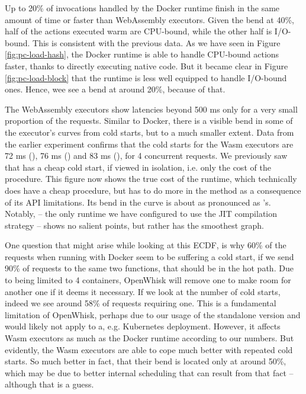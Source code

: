 Up to 20\% of invocations handled by the Docker runtime finish in the same amount of time or faster than WebAssembly executors. Given the bend at 40\%, half of the actions executed warm are CPU-bound, while the other half is I/O-bound. This is consistent with the previous data. As we have seen in Figure \ref{fig:pc-load-hash}, the Docker runtime is able to handle CPU-bound actions faster, thanks to directly executing native code. But it became clear in Figure \ref{fig:pc-load-block} that the runtime is less well equipped to handle I/O-bound ones. Hence, wee see a bend at around 20\%, because of that.

The WebAssembly executors show latencies beyond 500 ms only for a very small proportion of the requests. Similar to Docker, there is a visible bend in some of the executor's curves from cold starts, but to a much smaller extent. Data from the earlier experiment confirms that the cold starts for the Wasm executors are 72 ms (), 76 ms () and 83 ms (), for 4 concurrent requests.
We previously saw that  has a cheap cold start, if viewed in isolation, i.e. only the cost of the  procedure. This figure now shows the true cost of the runtime, which technically does have a cheap  procedure, but has to do more in the  method as a consequence of its API limitations. Its bend in the curve is about as pronounced as 's. Notably,  -- the only runtime we have configured to use the JIT compilation strategy -- shows no salient points, but rather has the smoothest graph.


One question that might arise while looking at this ECDF, is why 60\% of the requests when running with Docker seem to be suffering a cold start, if we send 90\% of requests to the same two functions, that should be in the hot path. Due to being limited to 4 containers, OpenWhisk will remove one to make room for another one if it deems it necessary. If we look at the number of cold starts, indeed we see around 58\% of requests requiring one. This is a fundamental limitation of OpenWhisk, perhaps due to our usage of the standalone version and would likely not apply to a, e.g. Kubernetes deployment. However, it affects Wasm executors as much as the Docker runtime according to our numbers. But evidently, the Wasm executors are able to cope much better with repeated cold starts. So much better in fact, that their bend is located only at around 50\%, which may be due to better internal scheduling that can result from that fact -- although that is a guess.

